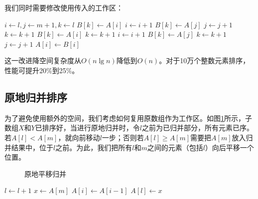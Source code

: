 \documentclass[b5paper]{ctexart}
\begin{document}
我们同时需要修改使用传入的工作区：

\begin{algorithmic}[1]
  \State $i \gets l, j \gets m + 1, k \gets l$
      \State $B[k] \gets A[i]$
      \State $i \gets i + 1$
    \Else
      \State $B[k] \gets A[j]$
      \State $j \gets j + 1$
    \EndIf
    \State $k \gets k + 1$
  \EndWhile
    \State $B[k] \gets A[i]$
    \State $k \gets k + 1$
    \State $i \gets i + 1$
  \EndWhile
    \State $B[k] \gets A[j]$
    \State $k \gets k + 1$
    \State $j \gets j + 1$
  \EndWhile
   
    \State $A[i] \gets B[i]$
  \EndFor
\EndProcedure
\end{algorithmic}

这一改进降空间复杂度从$O(n \lg n)$降低到$O(n)$。对于10万个整数元素排序，性能可提升20\%到25\%。

\subsection{原地归并排序}

为了避免使用额外的空间，我们考虑如何复用原数组作为工作区。如图\cref{fig:merge-in-place-naive}所示，子数组$X$和$Y$已排序好，当进行原地归并时，令$l$之前为已归并部分，所有元素已序。若$A[l] < A[m]$，就向前移动$l$一步；否则若$A[l] \geq A[m]$需要把$A[m]$放入归并结果中，位于$l$之前。为此，我们把所有$l$和$m$之间的元素（包括$l$）向后平移一个位置。

\begin{figure}[htbp]
 \centering
 \caption{原地平移归并}
 \label{fig:merge-in-place-naive}
\end{figure}

\begin{algorithmic}[1]
      \State $l \gets l + 1$
    \Else
      \State $x \gets A[m]$
       
        \State $A[i] \gets A[i-1]$
      \EndFor
      \State $A[l] \gets x$
    \EndIf
  \EndWhile
\EndProcedure
\end{algorithmic}
\end{document}
